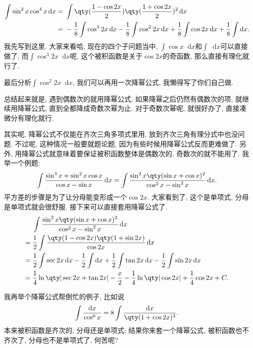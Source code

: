 \documentclass{ctexbook}
\newcommand*{\dif}{\mathop{}\!\mathrm{d}}
\begin{document}
{\begin{align*}
\int\sin^{2}{x}\cos^{4}{x}\dif{x}={}&\int\qty(\frac{1-\cos{2x}}{2})\qty(\frac{1+\cos{2x}}{2})^{2}\dif{x}\\
={}&-\frac{1}{8}\int\cos^{3}{2x}\dif{x}-\frac{1}{8}\int\cos^{2}{2x}\dif{x}+\frac{1}{8}\int\cos{2x}\dif{x}+\frac{1}{8}\int\dif{x}
.\end{align*}
我先写到这里. 大家来看哈, 现在的四个子问题当中, $\int\cos{x}\dif{x}$和$\int\dif{x}$可以直接做了, 而$\int\cos^{3}{2x}\dif{x}$呢, 这个被积函数是关于$\cos{2x}$的奇函数, 那么直接有理化就行了. \par
最后分析$\int\cos^{2}{2x}\dif{x}$, 我们可以再用一次降幂公式, 我懒得写了你们自己做. \par
总结起来就是, 遇到偶数次的就用降幂公式, 如果降幂之后仍然有偶数次的项, 就继续用降幂公式, 直到全都降成奇数次幂为止. 对于奇数次幂呢, 就很好办了, 直接凑微分有理化就行. \par
其实呢, 降幂公式不仅能在齐次三角多项式里用, 放到齐次三角有理分式中也没问题. 不过呢, 这种情况一般要就题论题, 因为有些时候用降幂公式反而更难做了. 另外, 用降幂公式就意味着要保证被积函数整体是偶数次的, 奇数次的就不能用了. 我举一个例题: 
\begin{align*}
\int\frac{\sin^{3}{x}+\sin^{2}{x}\cos{x}}{\cos{x}-\sin{x}}\dif{x}=\int\frac{\sin^{2}{x}\qty(\sin{x}+\cos{x})^{2}}{\cos^{2}{x}-\sin^{2}{x}}\dif{x}
.\end{align*}
平方差的步骤是为了让分母能变形成一个$\cos{2x}$. 大家看到了, 这个是单项式, 分母是单项式就会很舒服. 接下来可以直接套用降幂公式了. 
\begin{align*}
{}&\int\frac{\sin^{2}{x}\qty(\sin{x}+\cos{x})^{2}}{\cos^{2}{x}-\sin^{2}{x}}\dif{x}\\
={}&\frac{1}{2}\int\frac{\qty(1-\cos{2x})\qty(1+\sin{2x})}{\cos{2x}}\dif{x}\\
={}&\frac{1}{2}\int\sec{2x}\dif{x}-\frac{1}{2}\int\dif{x}+\frac{1}{2}\int\tan{2x}\dif{x}-\frac{1}{2}\int\sin{2x}\dif{x}\\
={}&\frac{1}{4}\ln\qty|\sec{2x}+\tan{2x}|-\frac{x}{2}-\frac{1}{4}\ln\qty|\cos{2x}|+\frac{1}{4}\cos{2x}+C
.\end{align*}\par
我再举个降幂公式帮倒忙的例子, 比如说
\begin{align*}
\int\frac{\dif{x}}{\cos^{6}{x}}=8\int\frac{\dif{x}}{\qty(1+\cos{2x})^{3}}
.\end{align*}
本来被积函数是齐次的, 分母还是单项式; 结果你来套一个降幂公式, 被积函数也不齐次了, 分母也不是单项式了, 何苦呢? \par
}
\end{document}
